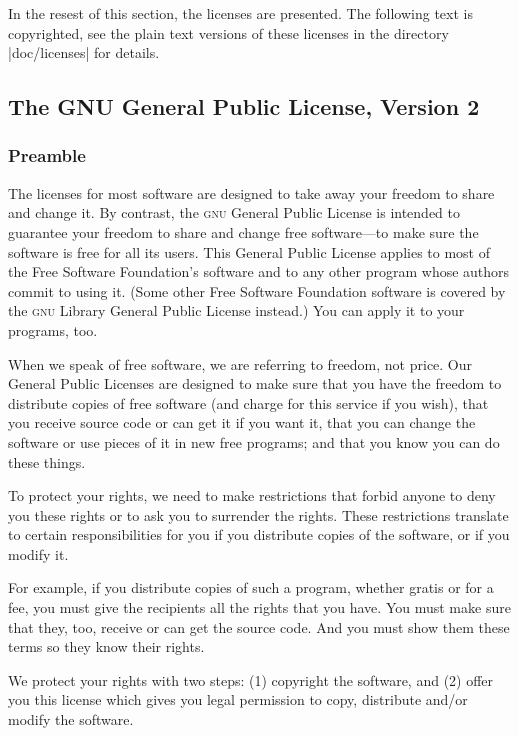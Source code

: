In the resest of this section, the licenses are presented. The following text is copyrighted, see the plain text versions of these licenses in the directory |doc/licenses| for details.


\subsection{The GNU General Public License, Version 2}

\subsubsection{Preamble}

The licenses for most software are designed to take away your freedom to share and change it. By contrast, the \textsc{gnu} General Public License is intended to guarantee your freedom to share and change free software---to make sure the software is free for all its users. This General Public License applies to most of the Free Software Foundation's software and to any other program whose authors commit to using it. (Some other Free Software Foundation software is covered by the \textsc{gnu} Library General Public License instead.) You can apply it to your programs, too.

When we speak of free software, we are referring to freedom, not price. Our General Public Licenses are designed to make sure that you have the freedom to distribute copies of free software (and charge for this service if you wish), that you receive source code or can get it if you want it, that you can change the software or use pieces of it in new free programs; and that you know you can do these things.

To protect your rights, we need to make restrictions that forbid anyone to deny you these rights or to ask you to surrender the rights. These restrictions translate to certain responsibilities for you if you distribute copies of the software, or if you modify it.

For example, if you distribute copies of such a program, whether gratis or for a fee, you must give the recipients all the rights that you have. You must make sure that they, too, receive or can get the source code. And you must show them these terms so they know their rights.

We protect your rights with two steps: (1) copyright the software, and (2) offer you this license which gives you legal permission to copy, distribute and/or modify the software.

